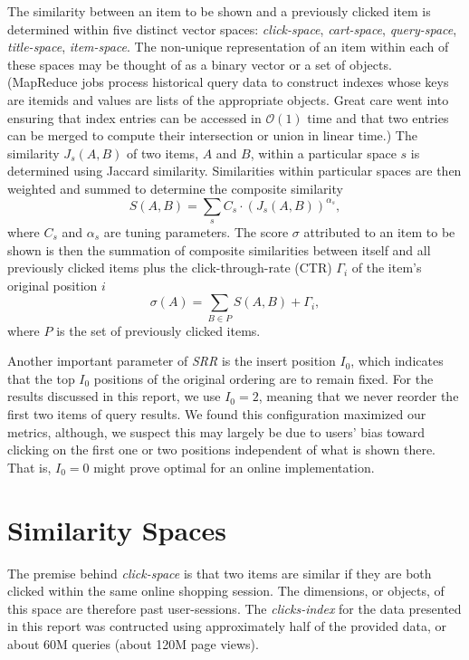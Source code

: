 \documentclass{article}
\begin{document}
The similarity between an item to be shown and a previously clicked item is
determined within five distinct vector spaces: {\em click-space}, {\em
cart-space}, {\em query-space}, {\em title-space}, {\em item-space}. The
non-unique representation of an item within each of these spaces may be thought
of as a binary vector or a set of objects. (MapReduce jobs process historical
query data to construct indexes whose keys are itemids and values are lists of
the appropriate objects. Great care went into ensuring that index entries can be
accessed in $\mathcal{O}(1)$ time and that two entries can be merged to compute their
intersection or union in linear time.) The similarity $J_s(A, B)$ of two items,
$A$ and $B$, within a particular space $s$ is determined using Jaccard
similarity. Similarities within particular spaces are then weighted and summed
to determine the composite similarity
\begin{equation}\label{eqn:similarity_metric}
    S(A, B) = \sum_s{C_s\cdot(J_s(A, B))^{\alpha_s}},
\end{equation}
where $C_s$ and $\alpha_s$ are tuning parameters. The score $\sigma$ attributed
to an item to be shown is then the summation of composite similarities between
itself and all previously clicked items plus the click-through-rate (CTR)
$\Gamma_i$ of the item's original position $i$
\begin{equation}\label{eqn:rerank_score}
    \sigma(A) = \sum_{B \in P}{S(A, B)} + \Gamma_i,
\end{equation}
where $P$ is the set of previously clicked items. 

Another important parameter of {\em SRR} is the insert position $I_0$, which
indicates that the top $I_0$ positions of the original ordering are to remain
fixed. For the results discussed in this report, we use $I_0 = 2$, meaning that
we never reorder the first two items of query results. We found this configuration
maximized our metrics, although, we suspect this may largely be due to users'
bias toward clicking on the first one or two positions independent of what is
shown there. That is, $I_0 = 0$ might prove optimal for an online implementation.

\section{Similarity Spaces}\label{sec:similarity_spaces}

The premise behind {\em click-space} is that two items are similar if they are
both clicked within the same online shopping session. The dimensions, or
objects, of this space are therefore past user-sessions. The {\em clicks-index}
for the data presented in this report was contructed using approximately half of
the provided data, or about 60M queries (about 120M page views).
\end{document}

